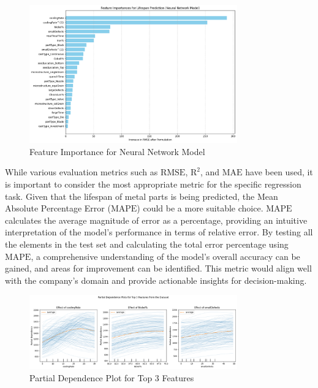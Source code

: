 \documentclass{article}
\begin{document}
\newpage
\begin{figure}[htbp]
    \centering
    \includegraphics[width=0.8\textwidth]{./Images/FeatureImportance-NeuralNetwork.png}
    \caption{Feature Importance for Neural Network Model}
    \label{fig:feature_importance_neural_network}
\end{figure}

While various evaluation metrics such as $\text{RMSE}$, $\text{R}^2$, and $\text{MAE}$ have been used, it is important to consider the most appropriate metric for the specific regression task. Given that the lifespan of metal parts is being predicted, the Mean Absolute Percentage Error ($\text{MAPE}$) could be a more suitable choice. $\text{MAPE}$ calculates the average magnitude of error as a percentage, providing an intuitive interpretation of the model's performance in terms of relative error. By testing all the elements in the test set and calculating the total error percentage using $\text{MAPE}$, a comprehensive understanding of the model's overall accuracy can be gained, and areas for improvement can be identified. This metric would align well with the company's domain and provide actionable insights for decision-making.

\begin{figure}[htbp]
    \centering
    \includegraphics[width=0.8\textwidth]{./Images/PartialDependence-Top3.png}
    \caption{Partial Dependence Plot for Top 3 Features}
    \label{fig:partial_dependence_top3}
\end{figure}
\end{document}
